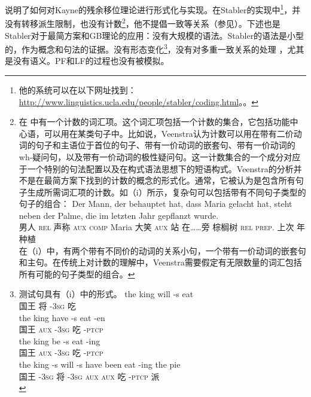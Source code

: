 \citet{Stabler2001a}说明了如何对Kayne的残余移位理论进行形式化与实现。在Stabler的实现中\footnote{%
他的系统可以在以下网址找到：
\url{http://www.linguistics.ucla.edu/people/stabler/coding.html}。。
}，并没有转移派生限制，也没有计数\footnote{%
在 \citet[第9章]{Veenstra98a}中有一个计数的词汇项。这个词汇项包括一个计数的集合，它包括功能中心语，可以用在某类句子中。比如说，Veenstra认为计数可以用在带有二价动词的句子和主语位于首位的句子、带有一价动词的嵌套句、带有一价动词的wh-疑问句，以及带有一价动词的极性疑问句。这一计数集合的一个成分对应于一个特别的句法配置以及在构式语法\indexcxg 思想下的短语构式。Veenstra的分析并不是在最简方案下找到的计数的概念的形式化。通常，它被认为是包含所有句子生成所需词汇项的计数。如（i）所示，复杂句可以包括带有不同句子类型的句子的组合：
\ea
\gll Der          Mann, der         behauptet hat,         dass          Maria gelacht hat,         steht neben        der          Palme, die im letzten Jahr gepflanzt wurde.\\
      男人  \textsc{rel} 声称      \textsc{aux} \textsc{comp} Maria 大笑     \textsc{aux} 站   在……旁  棕榈树 \textsc{rel} \textsc{prep}. 上次 年 种植 \passivepst{}\\
\z
在（i）中，有两个带有不同价的动词的关系小句，一个带有一价动词的嵌套句和主句。在传统上对计数的理解中，Veenstra需要假定有无限数量的词汇包括所有可能的句子类型的组合。
}，他不提倡一致等关系（参见\citealp[]{Fong2014a}）。下述也是Stabler对于最简方案\indexmg 和GB理论的应用：没有大规模的语法。Stabler的语法是小型的，作为概念和句法的证据。没有形态变化\footnote{%
测试句具有（i）中的形式。
\eal
\ex 
\gll the king will -s eat\\
	 国王 将 -\textsc{3sg} 吃\\
\ex 
\gll the king have -s eat -en\\
	 国王 \textsc{aux} -\textsc{3sg} 吃 -\textsc{ptcp}\\
\ex 
\gll the king be -s eat -ing\\
	 国王 \textsc{aux} -\textsc{3sg} 吃 -\textsc{ptcp}\\
\ex 
\gll the king -s will -s have been eat -ing the pie\\
	 国王 -\textsc{3sg} 将 -\textsc{3sg} \textsc{aux} \textsc{aux} 吃 -\textsc{ptcp}  派\\
\zllast\vspace{-.5\baselineskip}
}，没有对多重一致关系的处理 \citep[27.4.3]{Stabler2010b}，尤其是没有语义。PF和LF的过程也没有被模拟。
